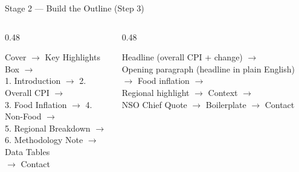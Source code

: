 \documentclass[xcolor={table,dvipsnames},aspectratio=169,11pt]{beamer}
\begin{document}
\begin{frame}{Stage 2 --- Build the Outline (Step 3)}
    \begin{columns}[t]
        \begin{column}{0.48\textwidth}
            \begin{tcolorbox}[colback=nsoLight, colframe=nsoBlue, title=CPI Bulletin Outline, coltitle=white, boxrule=1pt]
                \footnotesize
                Cover $\rightarrow$ Key Highlights Box $\rightarrow$ \\
                1. Introduction $\rightarrow$ 2. Overall CPI $\rightarrow$ \\
                3. Food Inflation $\rightarrow$ 4. Non-Food $\rightarrow$ \\
                5. Regional Breakdown $\rightarrow$ \\
                6. Methodology Note $\rightarrow$ Data Tables \\
                $\rightarrow$ Contact
            \end{tcolorbox}
        \end{column}
        \begin{column}{0.48\textwidth}
            \begin{tcolorbox}[colback=nsoLight, colframe=nsoBlue, title=Press Release Outline, coltitle=white, boxrule=1pt]
                \footnotesize
                Headline (overall CPI + change) $\rightarrow$ \\
                Opening paragraph (headline in plain English) $\rightarrow$ Food inflation $\rightarrow$ \\
                Regional highlight $\rightarrow$ Context $\rightarrow$ \\
                NSO Chief Quote $\rightarrow$ Boilerplate $\rightarrow$ Contact
            \end{tcolorbox}
        \end{column}
    \end{columns}
\end{frame}
\end{document}
